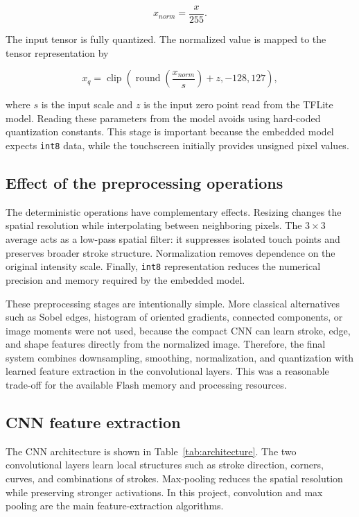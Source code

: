 \documentclass[conference]{IEEEtran}
\begin{document}
\[
x_{norm} = \frac{x}{255}.
\]

The input tensor is fully quantized. The normalized value is mapped to the tensor representation by

\[
x_q = \operatorname{clip}\left(\operatorname{round}\left(\frac{x_{norm}}{s}\right) + z, -128, 127\right),
\]

where $s$ is the input scale and $z$ is the input zero point read from the TFLite model. Reading these parameters from the model avoids using hard-coded quantization constants. This stage is important because the embedded model expects \texttt{int8} data, while the touchscreen initially provides unsigned pixel values.

\subsection{Effect of the preprocessing operations}
The deterministic operations have complementary effects. Resizing changes the spatial resolution while interpolating between neighboring pixels. The $3 \times 3$ average acts as a low-pass spatial filter: it suppresses isolated touch points and preserves broader stroke structure. Normalization removes dependence on the original intensity scale. Finally, \texttt{int8} representation reduces the numerical precision and memory required by the embedded model.

These preprocessing stages are intentionally simple. More classical alternatives such as Sobel edges, histogram of oriented gradients, connected components, or image moments were not used, because the compact CNN can learn stroke, edge, and shape features directly from the normalized image. Therefore, the final system combines downsampling, smoothing, normalization, and quantization with learned feature extraction in the convolutional layers. This was a reasonable trade-off for the available Flash memory and processing resources.

\subsection{CNN feature extraction}
The CNN architecture is shown in Table~\ref{tab:architecture}. The two convolutional layers learn local structures such as stroke direction, corners, curves, and combinations of strokes. Max-pooling reduces the spatial resolution while preserving stronger activations. In this project, convolution and max pooling are the main feature-extraction algorithms.
\end{document}

